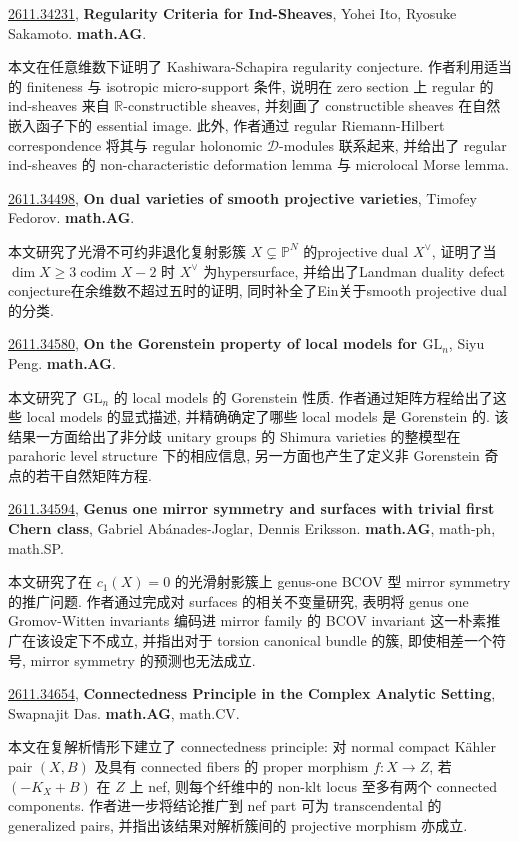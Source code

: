 \documentclass[9pt, a4paper]{article}
\theoremstyle{plain}
\theoremstyle{definition}
\theoremstyle{remark}
\newcommand{\arxivwithtarget}[3]{\hypertarget{#1}{}\href{https://arxiv.org/abs/#1}{#1}, \textbf{\textcolor{arxivblue}{#2}}, #3. }
\begin{document}
\arxivwithtarget{2611.34231}{Regularity Criteria for Ind-Sheaves}{Yohei Ito, Ryosuke Sakamoto}\textbf{math.AG}.

本文在任意维数下证明了 Kashiwara-Schapira regularity conjecture. 作者利用适当的 finiteness 与 isotropic micro-support 条件, 说明在 zero section 上 regular 的 ind-sheaves 来自 $\mathbb{R}$-constructible sheaves, 并刻画了 constructible sheaves 在自然嵌入函子下的 essential image. 此外, 作者通过 regular Riemann-Hilbert correspondence 将其与 regular holonomic $\mathcal{D}$-modules 联系起来, 并给出了 regular ind-sheaves 的 non-characteristic deformation lemma 与 microlocal Morse lemma.


\arxivwithtarget{2611.34498}{On dual varieties of smooth projective varieties}{Timofey Fedorov}\textbf{math.AG}.

本文研究了光滑不可约非退化复射影簇 $X\subsetneq\mathbb P^N$ 的projective dual $X^\vee$, 证明了当 $\operatorname{dim} X\ge3\operatorname{codim}X-2$ 时 $X^\vee$ 为hypersurface, 并给出了Landman duality defect conjecture在余维数不超过五时的证明, 同时补全了Ein关于smooth projective dual的分类.


\arxivwithtarget{2611.34580}{On the Gorenstein property of local models for $\mathrm{GL}_n$}{Siyu Peng}\textbf{math.AG}.

本文研究了 $\mathrm{GL}_n$ 的 local models 的 Gorenstein 性质. 作者通过矩阵方程给出了这些 local models 的显式描述, 并精确确定了哪些 local models 是 Gorenstein 的. 该结果一方面给出了非分歧 unitary groups 的 Shimura varieties 的整模型在 parahoric level structure 下的相应信息, 另一方面也产生了定义非 Gorenstein 奇点的若干自然矩阵方程.


\arxivwithtarget{2611.34594}{Genus one mirror symmetry and surfaces with trivial first Chern class}{Gabriel Abánades-Joglar, Dennis Eriksson}\textbf{math.AG}, math-ph, math.SP.

本文研究了在 $c_1(X)=0$ 的光滑射影簇上 genus-one BCOV 型 mirror symmetry 的推广问题. 作者通过完成对 surfaces 的相关不变量研究, 表明将 genus one Gromov-Witten invariants 编码进 mirror family 的 BCOV invariant 这一朴素推广在该设定下不成立, 并指出对于 torsion canonical bundle 的簇, 即使相差一个符号, mirror symmetry 的预测也无法成立.


\arxivwithtarget{2611.34654}{Connectedness Principle in the Complex Analytic Setting}{Swapnajit Das}\textbf{math.AG}, math.CV.

本文在复解析情形下建立了 connectedness principle: 对 normal compact Kähler pair $(X,B)$ 及具有 connected fibers 的 proper morphism $f:X\to Z$, 若 $(-K_X+B)$ 在 $Z$ 上 nef, 则每个纤维中的 non-klt locus 至多有两个 connected components. 作者进一步将结论推广到 nef part 可为 transcendental 的 generalized pairs, 并指出该结果对解析簇间的 projective morphism 亦成立.
\end{document}
